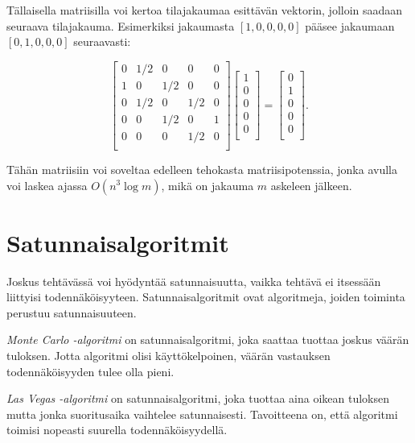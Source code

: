 Tällaisella matriisilla voi kertoa tilajakaumaa esittävän
vektorin, jolloin saadaan seuraava tilajakauma.
Esimerkiksi jakaumasta $[1,0,0,0,0]$ pääsee jakaumaan
$[0,1,0,0,0]$ seuraavasti:

\[ 
 \begin{bmatrix}
  0 & 1/2 & 0 & 0 & 0 \\
  1 & 0 & 1/2 & 0 & 0 \\
  0 & 1/2 & 0 & 1/2 & 0 \\
  0 & 0 & 1/2 & 0 & 1 \\
  0 & 0 & 0 & 1/2 & 0 \\
 \end{bmatrix}
 \begin{bmatrix}
  1 \\
  0 \\
  0 \\
  0 \\
  0 \\
 \end{bmatrix}
=
 \begin{bmatrix}
  0 \\
  1 \\
  0 \\
  0 \\
  0 \\
 \end{bmatrix}.
\]

Tähän matriisiin voi soveltaa edelleen tehokasta
matriisipotenssia, jonka avulla voi laskea
ajassa $O(n^3 \log m)$,
mikä on jakauma $m$ askeleen jälkeen.

\section{Satunnaisalgoritmit}


Joskus tehtävässä voi hyödyntää satunnaisuutta,
vaikka tehtävä ei itsessään liittyisi todennäköisyyteen.
Satunnaisalgoritmit ovat algoritmeja, joiden toiminta
perustuu satunnaisuuteen.


\textit{Monte Carlo -algoritmi} on satunnaisalgoritmi,
joka saattaa tuottaa joskus väärän tuloksen.
Jotta algoritmi olisi käyttökelpoinen,
väärän vastauksen todennäköisyyden tulee olla pieni.


\textit{Las Vegas -algoritmi} on satunnaisalgoritmi,
joka tuottaa aina oikean tuloksen mutta jonka
suoritusaika vaihtelee satunnaisesti.
Tavoitteena on, että algoritmi toimisi nopeasti
suurella todennäköisyydellä.

